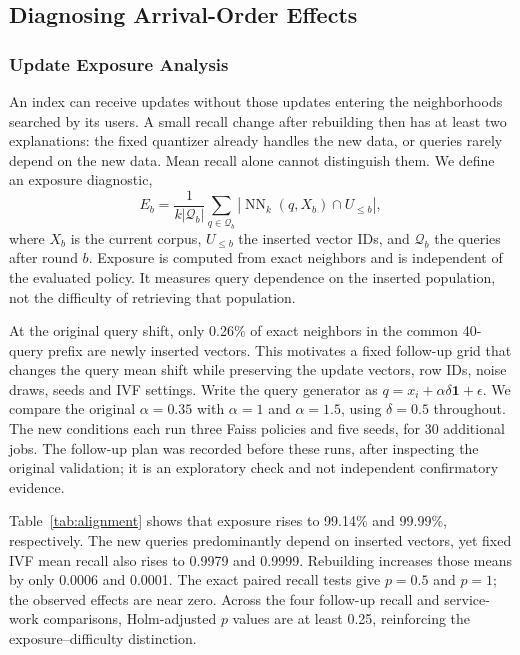 \subsection{Diagnosing Arrival-Order Effects}
\subsubsection{Update Exposure Analysis}
An index can receive updates without those updates entering the neighborhoods searched
by its users. A small recall change after rebuilding then has at least two explanations:
the fixed quantizer already handles the new data, or queries rarely depend on the new
data. Mean recall alone cannot distinguish them. We define an exposure diagnostic,
\begin{equation}
 E_b=\frac{1}{k|\mathcal Q_b|}\sum_{q\in\mathcal Q_b}
      |\operatorname{NN}_k(q,X_b)\cap U_{\leq b}|,
\end{equation}
where $X_b$ is the current corpus, $U_{\leq b}$ the inserted vector IDs, and
$\mathcal Q_b$ the queries after round $b$. Exposure is computed from exact neighbors
and is independent of the evaluated policy. It measures query dependence on the
inserted population, not the difficulty of retrieving that population.

At the original query shift, only 0.26\% of exact neighbors in the common 40-query
prefix are newly inserted vectors. This motivates a fixed follow-up grid that changes
the query mean shift while preserving the update vectors, row IDs, noise draws, seeds
and IVF settings. Write the query generator as
$q=x_i+\alpha\delta\mathbf{1}+\epsilon$. We compare the original $\alpha=0.35$ with
$\alpha=1$ and $\alpha=1.5$, using $\delta=0.5$ throughout. The new conditions each run
three Faiss policies and five seeds, for 30 additional jobs. The follow-up plan was
recorded before these runs, after inspecting the original validation; it is an
exploratory check and not independent confirmatory evidence.


Table~\ref{tab:alignment} shows that exposure rises to 99.14\% and 99.99\%, respectively.
The new queries predominantly depend on inserted vectors, yet fixed IVF mean recall
also rises to 0.9979 and 0.9999. Rebuilding increases those means by only 0.0006 and
0.0001. The exact paired recall tests give $p=0.5$ and $p=1$; the observed effects are
near zero. Across the four follow-up recall and service-work comparisons, Holm-adjusted
$p$ values are at least 0.25, reinforcing the exposure--difficulty distinction.

